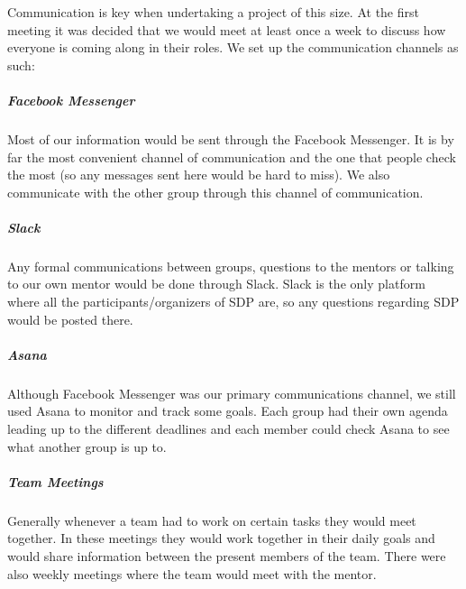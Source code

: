 Communication is key when undertaking a project of this size. At the first meeting it was decided that we would meet at least once a week to discuss how everyone is coming along in their roles. We set up the communication channels as such:

\subparagraph{Facebook Messenger}
Most of our information would be sent through the Facebook Messenger. It is by far the most convenient channel of communication and the one that people check the most (so any messages sent here would be hard to miss). We also communicate with the other group through this channel of communication.
\subparagraph{Slack}
Any formal communications between groups, questions to the mentors or talking to our own mentor would be done through Slack. Slack is the only platform where all the participants/organizers of SDP are, so any questions regarding SDP would be posted there.
\subparagraph{Asana}
Although Facebook Messenger was our primary communications channel, we still used Asana to monitor and track some goals. Each group had their own agenda leading up to the different deadlines and each member could check Asana to see what another group is up to.
\subparagraph{Team Meetings}
Generally whenever a team had to work on certain tasks they would meet together. In these meetings they would work together in their daily goals and would share information between the present members of the team. There were also weekly meetings where the team would meet with the mentor.